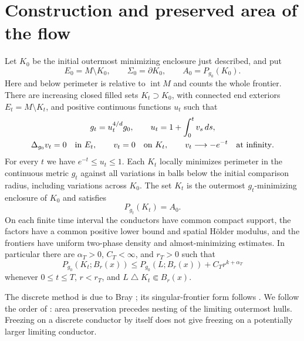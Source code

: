 \section{Construction and preserved area of the flow}
\label{sec:rpi:flow-construction}

\begin{lemma}
\label{lem:rpi:flow-construction}
Let $K_0$ be the initial outermost minimizing enclosure just described,
and put
\[
 E_0=M\setminus K_0,\qquad \Sigma_0=\partial K_0,
 \qquad A_0=P_{g_0}(K_0).
\]
Here and below perimeter is relative to $\operatorname{int}M$ and
counts the whole frontier. There are increasing closed filled sets
$K_t\supset K_0$, with connected end exteriors $E_t=M\setminus K_t$,
and positive continuous functions $u_t$ such that
\begin{equation}
\label{eq:rpi:flow-integral}
 \begin{gathered}
 g_t=u_t^{4/d}g_0,\qquad
 u_t=1+\int_0^t v_s\,ds,\\
 \Delta_{g_0}v_t=0\quad\hbox{in }E_t,\qquad
 v_t=0\quad\hbox{on }K_t,\qquad
 v_t\longrightarrow-e^{-t}\quad\hbox{at infinity}.
 \end{gathered}
\end{equation}
For every $t$ we have $e^{-t}\le u_t\le1$. Each $K_t$ locally
minimizes perimeter in the continuous metric $g_t$
against all variations in balls below the initial comparison radius,
including variations across $K_0$. The set $K_t$ is the
outermost $g_t$-minimizing enclosure of $K_0$ and satisfies
\begin{equation}
\label{eq:rpi:flow-area}
 P_{g_t}(K_t)=A_0.
\end{equation}
On each finite time interval the conductors have common compact
support, the factors have a common positive lower bound and spatial
H\"older modulus, and the frontiers have uniform two-phase density
and almost-minimizing estimates. In particular there are
$\alpha_T>0$, $C_T<\infty$, and $r_T>0$ such that
\begin{equation}
\label{eq:rpi:flow-almost-minimizing}
 P_{g_0}(K_t;B_r(x))
 \le P_{g_0}(L;B_r(x))+C_T r^{k+\alpha_T}
\end{equation}
whenever $0\le t\le T$, $r<r_T$, and
$L\mathbin{\triangle}K_t\Subset B_r(x)$.
\end{lemma}


The discrete method is due to Bray \cite{Bray2001}; its singular-frontier
form follows \cite[Section~2.1]{BiZhu2026v2}. We follow the order of
\cite[Lemmas~2.21 and~2.23 and Corollary~2.22]{BiZhu2026v2}:
area preservation precedes nesting of the limiting outermost hulls.
Freezing on a discrete conductor by itself does not give freezing on
a potentially larger limiting conductor.

